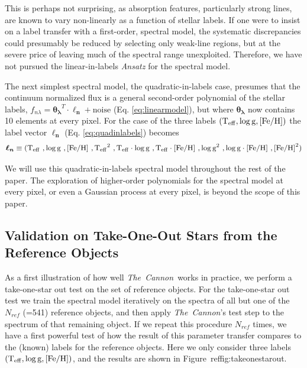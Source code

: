 \documentclass[12pt, preprint]{aastex}
\newcommand{\teff}{\mbox{$\rm T_{eff}$}}
\newcommand{\feh}{\mbox{$\rm [Fe/H]$}}
\newcommand{\logg}{\mbox{$\rm \log g$}}
\newcommand{\tc}{\textsl{The~Cannon}}
\begin{document}
This is perhaps not surprising, as absorption features, particularly strong lines, are known to vary non-linearly as a function of stellar labels. If one were to insist on a label transfer with a first-order, spectral model, the systematic discrepancies could presumably be reduced by selecting only weak-line regions, but at the severe price of leaving much of the spectral range unexploited. Therefore, we have not pursued the linear-in-labels \textit{Ansatz} for the spectral model.


The next simplest spectral model, the quadratic-in-labels case,
 presumes that the continuum normalized flux is a general second-order polynomial of the stellar labels, $f_{n\lambda} =
\boldsymbol{\theta_\lambda}^T \cdot \boldsymbol{\ell_n} + \mbox{noise}$ 
(Eq. \ref{eq:linearmodel}), 
but where $\boldsymbol{\theta_\lambda}$ now contains 10 elements at every pixel.
For the case of the three labels $(\teff , \logg , \feh)$ the label vector $\boldsymbol{\ell_n}$
(Eq. \ref{eq:quadinlabels})
becomes  
\begin{equation}
\boldsymbol{\ell_n}\equiv(\teff\  , \logg\  , \feh\  , \teff^2\ , \teff\cdot \logg\ , \teff \cdot\feh\ , \logg^2 \ , \logg\cdot \feh\  , \feh^2)
 \label{eq:quadin3labels}
 \end{equation}

We will use this quadratic-in-labels spectral model throughout the rest of the paper. 
The exploration of higher-order polynomials for the spectral model at every pixel, or even a Gaussian process at every pixel, is beyond the scope of this paper. 
 
\subsection{Validation on Take-One-Out Stars from the Reference Objects}
\label{sec:take-one-out}

As a first illustration of how well \tc\ works in practice, we perform a take-one-star out test on the set of reference objects.
For the take-one-star out test we train the spectral model iteratively on the spectra of all but one of the $N_{ref}$ (=541) 
reference objects, and then apply \tc 's test step to the spectrum of that remaining object. If we repeat this procedure $N_{ref}$ times, 
we have a first powerful test of how the result of this parameter transfer compares to the (known) labels for the reference objects.
 Here we only consider three labels $(\teff , \logg , \feh)$, and the results are shown in Figure~ref{fig:takeonestarout}.
\end{document}
